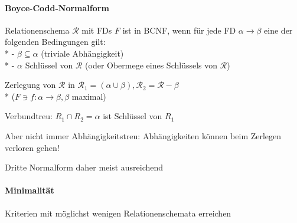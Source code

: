 \paragraph{Boyce-Codd-Normalform}
\begin{items}
	\item Relationenschema \( \mathcal{R} \) mit FDs \( F \) ist in BCNF, wenn für jede FD \( \alpha \to \beta \) eine der folgenden Bedingungen gilt: \\*
		- \( \beta \subseteq \alpha \) (triviale Abhängigkeit) \\*
		- \( \alpha \) Schlüssel von \( \mathcal{R} \) (oder Obermege eines Schlüssels von \( \mathcal{R} \))
	\item Zerlegung von \( \mathcal{R} \) in \( \mathcal{R}_{1} = (\alpha \cup \beta), \mathcal{R}_{2} = \mathcal{R}-\beta \) \\* (\( F \ni f : \alpha \to \beta, \beta \) maximal)
	\item Verbundtreu: $R_1 \cap R_2 = \alpha$ ist Schlüssel von $R_1$
	\item Aber nicht immer Abhängigkeitstreu: Abhängigkeiten können beim Zerlegen verloren gehen!
	\item Dritte Normalform daher meist ausreichend
\end{items}

\paragraph{Minimalität}
\begin{items}
	\item Kriterien mit möglichst wenigen Relationenschemata erreichen
\end{items}

